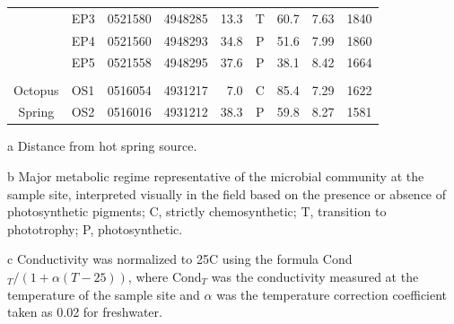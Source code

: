 {\begin{table}[htbp]
\begin{adjustbox}{width=\textwidth,keepaspectratio}
\begin{threeparttable}
\begin{tabular}{clccrcccc}
      & EP3   & 0521580 & 4948285 & 13.3  & T     & 60.7  & 7.63  & 1840 \\
      & EP4   & 0521560 & 4948293 & 34.8  & P     & 51.6  & 7.99  & 1860 \\
      & EP5   & 0521558 & 4948295 & 37.6  & P     & 38.1  & 8.42  & 1664 \\
      &       &       &       &       &       &       &       &  \\
Octopus & OS1   & 0516054 & 4931217 & 7.0   & C     & 85.4  & 7.29  & 1622 \\
Spring & OS2   & 0516016 & 4931212 & 38.3  & P     & 59.8  & 8.27  & 1581 \\
\bottomrule
\end{tabular}%

    \begin{tablenotes}
      \small
      \item[a] Distance from hot spring source.
      \item[b] Major metabolic regime representative of the microbial community at the sample site, interpreted visually in the field based on the presence or absence of photosynthetic pigments; C, strictly chemosynthetic; T, transition to phototrophy; P, photosynthetic.
      \item[c] Conductivity was normalized to 25\degree C using the formula Cond$_{T}/(1+\alpha(T-25))$, where Cond$_{T}$ was the conductivity measured at the temperature of the sample site and $\alpha$ was the temperature correction coefficient taken as 0.02 for freshwater.
    \end{tablenotes}
  \label{tab:geophysical}%
  \end{threeparttable}
  \end{adjustbox}
\end{table}%
\doublespace
\clearpage
}




